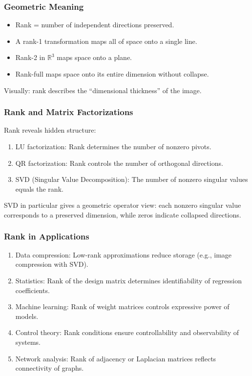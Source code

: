 \documentclass[
  letterpaper,
  DIV=11,
  numbers=noendperiod]{scrreprt}
\providecommand{\tightlist}{%
  \setlength{\itemsep}{0pt}\setlength{\parskip}{0pt}}
\begin{document}
\subsubsection{Geometric Meaning}\label{geometric-meaning-7}

\begin{itemize}
\tightlist
\item
  Rank = number of independent directions preserved.
\item
  A rank-1 transformation maps all of space onto a single line.
\item
  Rank-2 in \(\mathbb{R}^3\) maps space onto a plane.
\item
  Rank-full maps space onto its entire dimension without collapse.
\end{itemize}

Visually: rank describes the ``dimensional thickness'' of the image.

\subsubsection{Rank and Matrix
Factorizations}\label{rank-and-matrix-factorizations}

Rank reveals hidden structure:

\begin{enumerate}
\def\labelenumi{\arabic{enumi}.}
\tightlist
\item
  LU factorization: Rank determines the number of nonzero pivots.
\item
  QR factorization: Rank controls the number of orthogonal directions.
\item
  SVD (Singular Value Decomposition): The number of nonzero singular
  values equals the rank.
\end{enumerate}

SVD in particular gives a geometric operator view: each nonzero singular
value corresponds to a preserved dimension, while zeros indicate
collapsed directions.

\subsubsection{Rank in Applications}\label{rank-in-applications}

\begin{enumerate}
\def\labelenumi{\arabic{enumi}.}
\tightlist
\item
  Data compression: Low-rank approximations reduce storage (e.g., image
  compression with SVD).
\item
  Statistics: Rank of the design matrix determines identifiability of
  regression coefficients.
\item
  Machine learning: Rank of weight matrices controls expressive power of
  models.
\item
  Control theory: Rank conditions ensure controllability and
  observability of systems.
\item
  Network analysis: Rank of adjacency or Laplacian matrices reflects
  connectivity of graphs.
\end{enumerate}
\end{document}
